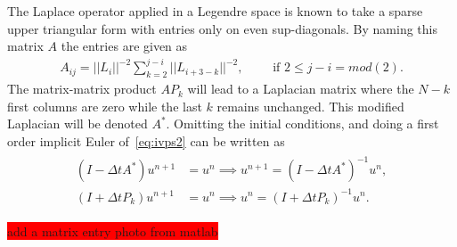 The Laplace operator applied in a Legendre space is known to take a sparse upper triangular form
with entries only on even sup-diagonals. By naming this matrix $A$ the entries are given as 
\begin{align}
    A_{ij} = ||L_i||^{-2} \sum_{k=2}^{j-i} ||L_{i+3-k}||^{-2}, \qquad \text{ if } 2 \le j-i = mod(2). 
    \label{Laplace-entries}
\end{align}
The matrix-matrix product $AP_{k}$ will lead to a Laplacian matrix where the $N-k$ first columns are zero
while the last $k$ remains unchanged. This modified Laplacian will be denoted $A^*$.
Omitting the initial conditions, and doing a first order implicit 
Euler of~\ref{eq:ivps2} can be written as 
\begin{align}
    \begin{split}
    (I-\Delta t A^*)u^{n+1} &= u^n  \implies u^{n+1}= (I-\Delta t A^*)^{-1}u^{n}, \\
    (I+\Delta t P_{k})u^{n+1} &= u^n \implies u^n = (I+\Delta t P_{k})^{-1}u^{n}.
    \label{eq:timestep}
    \end{split}
\end{align}

\colorbox{red}{add a matrix entry photo from matlab}

